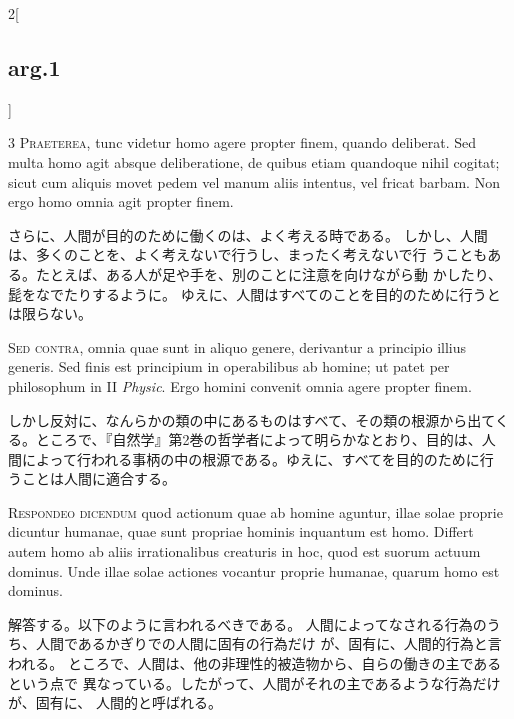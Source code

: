 \documentclass[paper=a4paper,fontsize=10pt,jafontsize=9pt,titlepage]{jlreq}
\begin{document}
\begin{paracol}{2}[\subsection{arg.1}]

{\scshape 3 Praeterea}, tunc videtur homo agere
propter finem, quando deliberat. Sed multa homo agit absque
deliberatione, de quibus etiam quandoque nihil cogitat; sicut cum
aliquis movet pedem vel manum aliis intentus, vel fricat barbam. Non
ergo homo omnia agit propter finem.

\switchcolumn

さらに、人間が目的のために働くのは、よく考える時である。
しかし、人間は、多くのことを、よく考えないで行うし、まったく考えないで行
 うこともある。たとえば、ある人が足や手を、別のことに注意を向けながら動
 かしたり、髭をなでたりするように。
ゆえに、人間はすべてのことを目的のために行うとは限らない。

\switchcolumn*[\subsection{s.c.}]

{\scshape Sed contra}, omnia quae sunt in aliquo
genere, derivantur a principio illius generis. Sed finis est principium
in operabilibus ab homine; ut patet per philosophum in II {\itshape Physic}. Ergo
homini convenit omnia agere propter finem.

\switchcolumn

しかし反対に、なんらかの類の中にあるものはすべて、その類の根源から出てく
 る。ところで、『自然学』第2巻の哲学者によって明らかなとおり、目的は、人
 間によって行われる事柄の中の根源である。ゆえに、すべてを目的のために行
 うことは人間に適合する。


{\scshape Respondeo dicendum} quod actionum quae ab
homine aguntur, illae solae proprie dicuntur humanae, quae sunt propriae
hominis inquantum est homo. Differt autem homo ab aliis irrationalibus
creaturis in hoc, quod est suorum actuum dominus. Unde illae solae
actiones vocantur proprie humanae, quarum homo est dominus.

\switchcolumn

解答する。以下のように言われるべきである。
人間によってなされる行為のうち、人間であるかぎりでの人間に固有の行為だけ
 が、固有に、人間的行為と言われる。
ところで、人間は、他の非理性的被造物から、自らの働きの主であるという点で
 異なっている。したがって、人間がそれの主であるような行為だけが、固有に、
 人間的と呼ばれる。


\end{paracol}
\end{document}
